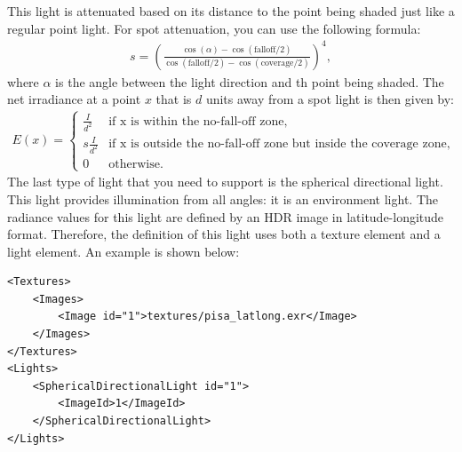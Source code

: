 \documentclass[12pt]{article}
\begin{document}
This light is attenuated based on its distance to the point being
shaded just like a regular point light. For spot attenuation, you can
use the following formula:
%
\begin{align}
s = \left(\frac{\cos(\alpha) -
    \cos(\textrm{falloff}/2)}{\cos(\textrm{falloff}/2)-\cos(\textrm{coverage}/2)}\right)^4,
\end{align}
%
where $\alpha$ is the angle between the light direction and th point
being shaded. The net irradiance at a point $x$ that is $d$ units away
from a spot light is then given by:
%
\begin{align}
E(x) =
\begin{cases}
\frac{I}{d^2} & \textrm{if x is within the no-fall-off zone,} \\
s\frac{I}{d^2} & \textrm{if x is outside the no-fall-off zone but
    inside the coverage zone,} \\
0 & \textrm{otherwise}.
\end{cases}
\end{align}
%
The last type of light that you need to support is the spherical
directional light. This light provides illumination from all angles:
it is an environment light. The radiance values for this light are
defined by an HDR image in latitude-longitude format. Therefore, the
definition of this light uses both a texture element and a light
element. An example is shown below:

\begin{verbatim}
<Textures>
    <Images>
        <Image id="1">textures/pisa_latlong.exr</Image>
    </Images>
</Textures>
<Lights>
    <SphericalDirectionalLight id="1">
        <ImageId>1</ImageId>
    </SphericalDirectionalLight>
</Lights>
\end{verbatim}
\end{document}
